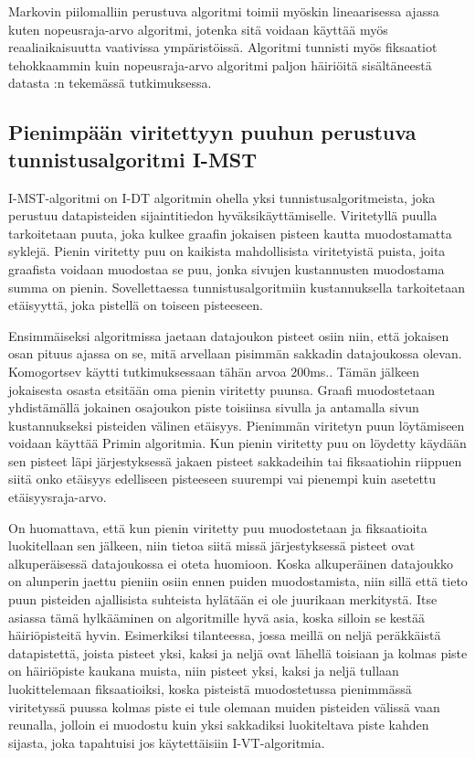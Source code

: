 Markovin piilomalliin perustuva algoritmi toimii myöskin lineaarisessa ajassa kuten nopeusraja-arvo algoritmi, jotenka sitä voidaan käyttää myös reaaliaikaisuutta vaativissa ympäristöissä. Algoritmi tunnisti myös fiksaatiot tehokkaammin kuin nopeusraja-arvo algoritmi paljon häiriöitä sisältäneestä datasta \citet[s. 32]{salvucci1999}:n tekemässä tutkimuksessa.

\subsection{Pienimpään viritettyyn puuhun perustuva tunnistusalgoritmi I-MST}
I-MST-algoritmi on I-DT algoritmin ohella yksi tunnistusalgoritmeista, joka perustuu datapisteiden sijaintitiedon hyväksikäyttämiselle. Viritetyllä puulla tarkoitetaan puuta, joka kulkee graafin jokaisen pisteen kautta muodostamatta syklejä. Pienin viritetty puu on kaikista mahdollisista viritetyistä puista, joita graafista voidaan muodostaa se puu, jonka sivujen kustannusten muodostama summa on pienin. Sovellettaessa tunnistusalgoritmiin kustannuksella tarkoitetaan etäisyyttä, joka pistellä on toiseen pisteeseen.

Ensimmäiseksi algoritmissa jaetaan datajoukon pisteet osiin niin, että jokaisen osan pituus ajassa on se, mitä arvellaan pisimmän sakkadin datajoukossa olevan. Komogortsev käytti tutkimuksessaan tähän arvoa 200ms.\citep[s. 3 ]{komogortsev2010}. Tämän jälkeen jokaisesta osasta etsitään oma pienin viritetty puunsa. Graafi muodostetaan yhdistämällä jokainen osajoukon piste toisiinsa sivulla ja antamalla sivun kustannukseksi pisteiden välinen etäisyys. Pienimmän viritetyn puun löytämiseen voidaan käyttää Primin algoritmia.\citep[s. 75]{salvucci2000} Kun pienin viritetty puu on löydetty käydään sen pisteet läpi järjestyksessä jakaen pisteet sakkadeihin tai fiksaatiohin riippuen siitä onko etäisyys edelliseen pisteeseen suurempi vai pienempi kuin asetettu etäisyysraja-arvo.

On huomattava, että kun pienin viritetty puu muodostetaan ja fiksaatioita luokitellaan sen jälkeen, niin tietoa siitä missä järjestyksessä pisteet ovat alkuperäisessä datajoukossa ei oteta huomioon. Koska alkuperäinen datajoukko on alunperin jaettu pieniin osiin ennen puiden muodostamista, niin sillä että tieto puun pisteiden ajallisista suhteista hylätään ei ole juurikaan merkitystä. Itse asiassa tämä hylkääminen on algoritmille hyvä asia, koska silloin se kestää häiriöpisteitä hyvin. Esimerkiksi tilanteessa, jossa meillä on neljä peräkkäistä datapistettä, joista pisteet yksi, kaksi ja neljä ovat lähellä toisiaan ja kolmas piste on häiriöpiste kaukana muista, niin pisteet yksi, kaksi ja neljä tullaan luokittelemaan fiksaatioiksi, koska pisteistä muodostetussa pienimmässä viritetyssä puussa kolmas piste ei tule olemaan muiden pisteiden välissä vaan reunalla, jolloin ei muodostu kuin yksi sakkadiksi luokiteltava piste kahden sijasta, joka tapahtuisi jos käytettäisiin I-VT-algoritmia.

